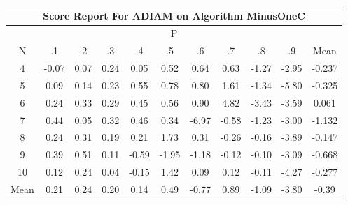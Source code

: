 \documentclass[11pt,a4paper]{report}
\begin{document}
\begin{longtable}{ | c || c | c | c | c | c | c | c | c | c || c |}
\hline
\multicolumn{11}{|c|}{ Score Report For ADIAM on Algorithm MinusOneC} \\
\hline
\multicolumn{11}{|c|}{ P } \\
\hline
N & .1 & .2 & .3 & .4 & .5 & .6 & .7 & .8 & .9 & Mean\\
 \hline
 \hline
 \endhead
  4 &  \cellcolor[HTML]{FFFFFF} -0.07 &  \cellcolor[HTML]{FFFFFF} 0.07 &  \cellcolor[HTML]{F7F7FF} 0.24 &  \cellcolor[HTML]{FFFFFF} 0.05 &  \cellcolor[HTML]{EFEFFF} 0.52 &  \cellcolor[HTML]{EFEFFF} 0.64 &  \cellcolor[HTML]{EFEFFF} 0.63 &  \cellcolor[HTML]{FFDFDF} -1.27 &  \cellcolor[HTML]{FFB7B7} -2.95 & -0.237 \\
  5 &  \cellcolor[HTML]{FFFFFF} 0.09 &  \cellcolor[HTML]{FFFFFF} 0.14 &  \cellcolor[HTML]{F7F7FF} 0.23 &  \cellcolor[HTML]{EFEFFF} 0.55 &  \cellcolor[HTML]{EFEFFF} 0.78 &  \cellcolor[HTML]{E7E7FF} 0.80 &  \cellcolor[HTML]{D7D7FF} 1.61 &  \cellcolor[HTML]{FFDFDF} -1.34 &  \cellcolor[HTML]{FF7070} -5.80 & -0.325 \\
  6 &  \cellcolor[HTML]{F7F7FF} 0.24 &  \cellcolor[HTML]{F7F7FF} 0.33 &  \cellcolor[HTML]{F7F7FF} 0.29 &  \cellcolor[HTML]{F7F7FF} 0.45 &  \cellcolor[HTML]{EFEFFF} 0.56 &  \cellcolor[HTML]{E7E7FF} 0.90 &  \cellcolor[HTML]{8787FF} 4.82 &  \cellcolor[HTML]{FFA7A7} -3.43 &  \cellcolor[HTML]{FFA7A7} -3.59 & 0.061 \\
  7 &  \cellcolor[HTML]{F7F7FF} 0.44 &  \cellcolor[HTML]{FFFFFF} 0.05 &  \cellcolor[HTML]{F7F7FF} 0.32 &  \cellcolor[HTML]{F7F7FF} 0.46 &  \cellcolor[HTML]{F7F7FF} 0.34 &  \cellcolor[HTML]{FF5050} -6.97 &  \cellcolor[HTML]{FFEFEF} -0.58 &  \cellcolor[HTML]{FFDFDF} -1.23 &  \cellcolor[HTML]{FFB7B7} -3.00 & -1.132 \\
  8 &  \cellcolor[HTML]{F7F7FF} 0.24 &  \cellcolor[HTML]{F7F7FF} 0.31 &  \cellcolor[HTML]{F7F7FF} 0.19 &  \cellcolor[HTML]{F7F7FF} 0.21 &  \cellcolor[HTML]{D7D7FF} 1.73 &  \cellcolor[HTML]{F7F7FF} 0.31 &  \cellcolor[HTML]{FFF7F7} -0.26 &  \cellcolor[HTML]{FFF7F7} -0.16 &  \cellcolor[HTML]{FF9F9F} -3.89 & -0.147 \\
  9 &  \cellcolor[HTML]{F7F7FF} 0.39 &  \cellcolor[HTML]{EFEFFF} 0.51 &  \cellcolor[HTML]{FFFFFF} 0.11 &  \cellcolor[HTML]{FFEFEF} -0.59 &  \cellcolor[HTML]{FFCFCF} -1.95 &  \cellcolor[HTML]{FFDFDF} -1.18 &  \cellcolor[HTML]{FFFFFF} -0.12 &  \cellcolor[HTML]{FFFFFF} -0.10 &  \cellcolor[HTML]{FFAFAF} -3.09 & -0.668 \\
  10 &  \cellcolor[HTML]{FFFFFF} 0.12 &  \cellcolor[HTML]{F7F7FF} 0.24 &  \cellcolor[HTML]{FFFFFF} 0.04 &  \cellcolor[HTML]{FFFFFF} -0.15 &  \cellcolor[HTML]{DFDFFF} 1.42 &  \cellcolor[HTML]{FFFFFF} 0.09 &  \cellcolor[HTML]{FFFFFF} 0.12 &  \cellcolor[HTML]{FFFFFF} -0.11 &  \cellcolor[HTML]{FF9797} -4.27 & -0.277 \\
 \hline
 \hline
Mean &  \cellcolor[HTML]{F7F7FF} 0.21 &  \cellcolor[HTML]{F7F7FF} 0.24 &  \cellcolor[HTML]{F7F7FF} 0.20 &  \cellcolor[HTML]{FFFFFF} 0.14 &  \cellcolor[HTML]{EFEFFF} 0.49 &  \cellcolor[HTML]{FFEFEF} -0.77 &  \cellcolor[HTML]{E7E7FF} 0.89 &  \cellcolor[HTML]{FFE7E7} -1.09 &  \cellcolor[HTML]{FF9F9F} -3.80 &  \cellcolor[HTML]{FFF7F7} -0.39
\end{longtable}
\end{document}
